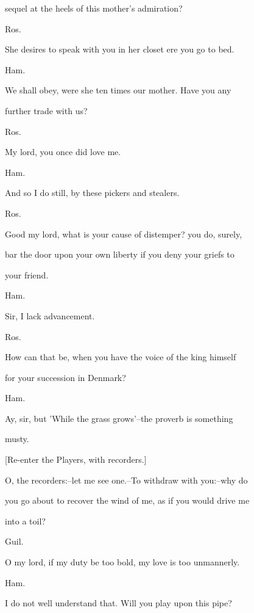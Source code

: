 \documentclass[12pt]{book}
\begin{document}
sequel at the heels of this mother's admiration?



Ros.

She desires to speak with you in her closet ere you go to bed.



Ham.

We shall obey, were she ten times our mother. Have you any

further trade with us?



Ros.

My lord, you once did love me.



Ham.

And so I do still, by these pickers and stealers.



Ros.

Good my lord, what is your cause of distemper? you do, surely,

bar the door upon your own liberty if you deny your griefs to

your friend.



Ham.

Sir, I lack advancement.



Ros.

How can that be, when you have the voice of the king himself

for your succession in Denmark?



Ham.

Ay, sir, but 'While the grass grows'--the proverb is something

musty.



[Re-enter the Players, with recorders.]



O, the recorders:--let me see one.--To withdraw with you:--why do

you go about to recover the wind of me, as if you would drive me

into a toil?



Guil.

O my lord, if my duty be too bold, my love is too unmannerly.



Ham.

I do not well understand that. Will you play upon this pipe?
\end{document}
